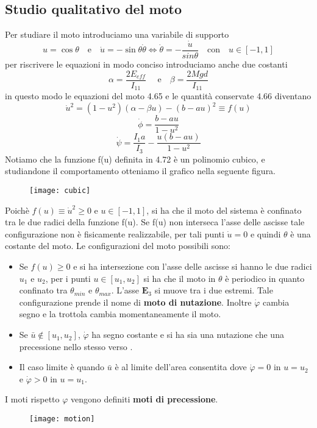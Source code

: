 \subsection{Studio qualitativo del moto}
Per studiare il moto introduciamo una variabile di supporto 
\begin{equation*}
	u = \cos \theta \quad \text{e} \quad \dot{u} =- \sin \theta \dot{\theta} \iff \dot{\theta} = - \frac{\dot{u}}{sin \theta}\quad \text{con} 
   \quad u \in [-1,1] 
\end{equation*}
per riscrivere le equazioni in modo conciso introduciamo anche due costanti 
\begin{equation}
\alpha=\frac{2 E_{eff}}{I_{11}} \quad \text { e} \quad \beta=\frac{2 M g d}{I_{11}}
\end{equation}
in questo modo le equazioni del moto 4.65 e le quantit\`{a} conservate 4.66 diventano 
\begin{equation}
\dot{u}^2=\left(1-u^2\right)(\alpha-\beta u)-(b-a u)^2 \equiv f(u)
\end{equation}
\begin{equation}
\dot{\phi}=\frac{b-a u}{1-u^2}
\end{equation}
\begin{equation}
\dot{\psi}=\frac{I_1 a}{I_3}-\frac{u(b-a u)}{1-u^2}
\end{equation}
Notiamo che la funzione f(u) definita in 4.72 \`{e} un polinomio cubico, e studiandone il comportamento otteniamo il grafico nella seguente figura.
 \newpage
\begin{figure}[!ht]
\texttt{[image: cubic]}	
\centering
\end{figure}
\noindent Poich\`{e} $f(u) \equiv \dot{u}^2 \geq 0 $ e $u \in [-1,1]$, si ha che il moto del sistema \`{e} confinato tra le due radici della funzione f(u). Se f(u) non interseca l'asse delle ascisse tale configurazione non \`{e} fisicamente realizzabile, per tali punti $\dot{u} = 0$ e quindi $\theta $ \`{e} una costante del moto. Le configurazioni del moto possibili sono:
\begin{itemize}

\item Se $f(u) \geq 0$ e si ha intersezione con l'asse delle ascisse si hanno le due radici $u_1$ e $u_2$, per i punti $u \in [u_1,u_2]$ si ha che il moto in $\theta$ \`{e} periodico in quanto confinato tra $\theta_{min}$ e $\theta_{max}$. L'asse $\bm{E}_{3}$ si muove tra i due estremi. Tale configurazione prende il nome di \textbf{moto di nutazione}. Inoltre $\dot{\varphi}$ cambia segno e la trottola cambia momentaneamente il moto.
\item Se $\bar{u} \notin [u_{1},u_{2}]$, $\dot{\varphi}$ ha segno costante e si ha sia una nutazione che una precessione nello stesso verso . 
\item Il caso limite \`{e} quando $\bar{u}$ \`{e} al limite dell'area consentita dove $\dot{\varphi} = 0$ in $u = u_2$ e $\dot{\varphi} > 0 $ in $u = u_1$. 
\end{itemize}
I moti rispetto $\varphi$ vengono definiti \textbf{moti di precessione}.
\begin{figure}[!ht]
\texttt{[image: motion]}	
\centering
\end{figure}
